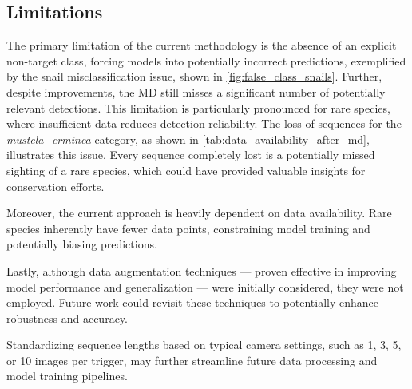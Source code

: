 \subsection{Limitations}
The primary limitation of the current methodology is the absence of an explicit non-target class, forcing models into potentially incorrect predictions, exemplified by the snail misclassification issue, shown in \autoref{fig:false_class_snails}.
Further, despite improvements, the \ac{MD} still misses a significant number of potentially relevant detections.
This limitation is particularly pronounced for rare species, where insufficient data reduces detection reliability.
The loss of sequences for the \textit{mustela\_erminea} category, as shown in \autoref{tab:data_availability_after_md}, illustrates this issue.
Every sequence completely lost is a potentially missed sighting of a rare species, which could have provided valuable insights for conservation efforts.

Moreover, the current approach is heavily dependent on data availability.
Rare species inherently have fewer data points, constraining model training and potentially biasing predictions.

Lastly, although data augmentation techniques --- proven effective in improving model performance and generalization \autocite{shortenSurveyImageData2019} --- were initially considered, they were not employed.
Future work could revisit these techniques to potentially enhance robustness and accuracy.

Standardizing sequence lengths based on typical camera settings, such as 1, 3, 5, or 10 images per trigger, may further streamline future data processing and model training pipelines.